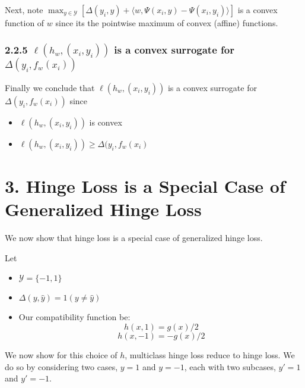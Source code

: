 \documentclass[paper=a4, fontsize=11pt]{scrartcl} %
\numberwithin{equation}{section} %
\numberwithin{figure}{section} %
\numberwithin{table}{section} %
\begin{document}
Next, note $\max_{y \in \mathcal{Y}} [\Delta(y_i, y)+ \langle w, \Psi(x_i, y) - \Psi(x_i, y_i) \rangle]$ is a convex function of $w$ since its the pointwise maximum of convex (affine) functions.

\subsubsection*{2.2.5 $\ell(h_w, (x_i,y_i))$ is a convex surrogate for $\Delta(y_i, f_w(x_i))$}

Finally we conclude that $\ell(h_w, (x_i,y_i))$ is a convex surrogate for $\Delta(y_i, f_w(x_i))$ since
\begin{itemize}
\item $\ell(h_w, (x_i,y_i))$ is convex
\item $\ell(h_w, (x_i,y_i)) \geq \Delta(y_i, f_w(x_i)$
\end{itemize}



\section*{3. Hinge Loss is a Special Case of Generalized Hinge Loss}

We now show that hinge loss is a special case of generalized hinge loss.

Let
\begin{itemize}
\item $\mathcal{Y} = \{-1, 1\}$
\item $\Delta(y, \hat{y}) = 1(y \ne \hat{y})$
\item Our compatibility function be:
\[h(x, 1) = g(x)/2\]
\[h(x, -1) = - g(x)/2\]
\end{itemize}

We now show for this choice of $h$, multiclass hinge loss reduce to hinge loss. We do so by considering two cases, $y = 1$ and $y = -1$, each with two subcases, $y' = 1$ and $y' = -1$.
\end{document}
